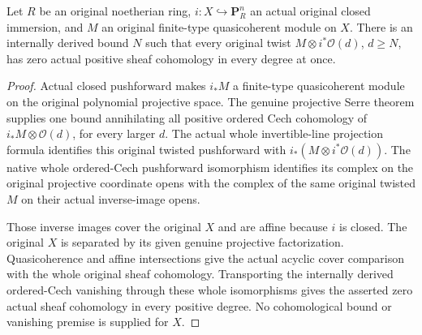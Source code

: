 \begin{theorem}
\label{thm:fc-closed-projective-serre-vanishing}
\leanok
{}
Let $R$ be an original noetherian ring, $i:X\hookrightarrow\mathbf P^n_R$
an actual original closed immersion, and $M$ an original finite-type
quasicoherent module on $X$. There is an internally derived bound $N$
such that every original twist
$M\otimes i^*\mathcal O(d)$, $d\geq N$, has zero actual positive sheaf
cohomology in every degree at once.
\end{theorem}
\begin{proof}
Actual closed pushforward makes $i_*M$ a finite-type quasicoherent module
on the original polynomial projective space. The genuine projective
Serre theorem supplies one bound annihilating all positive ordered Cech
cohomology of $i_*M\otimes\mathcal O(d)$, for every larger $d$.
The actual whole invertible-line projection formula identifies this
original twisted pushforward with
$i_*(M\otimes i^*\mathcal O(d))$. The native whole ordered-Cech
pushforward isomorphism identifies its complex on the original projective
coordinate opens with the complex of the same original twisted $M$ on
their actual inverse-image opens.

Those inverse images cover the original $X$ and are affine because $i$
is closed. The original $X$ is separated by its given genuine projective
factorization. Quasicoherence and affine intersections give the actual
acyclic cover comparison with the whole original sheaf cohomology.
Transporting the internally derived ordered-Cech vanishing through these
whole isomorphisms gives the asserted zero actual sheaf cohomology in
every positive degree. No cohomological bound or vanishing premise is
supplied for $X$.
\end{proof}
